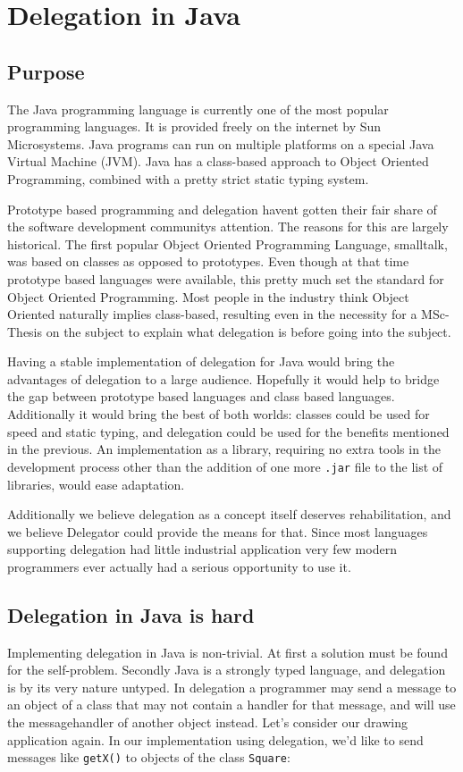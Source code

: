 \documentclass[a4paper,12pt]{book}
\begin{document}
\chapter{Delegation in Java}
\section*{Purpose}
The Java programming language is currently one of the most popular programming languages. It is provided freely on the internet by Sun Microsystems. Java programs can run on multiple platforms on a special Java Virtual Machine (JVM). Java has a class-based approach to Object Oriented Programming, combined with a pretty strict static typing system.

Prototype based programming and delegation havent gotten their fair share of the software development communitys attention. The reasons for this are largely historical. The first popular Object Oriented Programming Language, smalltalk, was based on classes as opposed to prototypes. Even though at that time prototype based languages were available, this pretty much set the standard for Object Oriented Programming. Most people in the industry think Object Oriented naturally implies class-based, resulting even in the necessity for a MSc-Thesis on the subject to explain what delegation is before going into the subject.

Having a stable implementation of delegation for Java would bring the advantages of delegation to a large audience. Hopefully it would help to bridge the gap between prototype based languages and class based languages. Additionally it would bring the best of both worlds: classes could be used for speed and static typing, and delegation could be used for the benefits mentioned in the previous. An implementation as a library, requiring no extra tools in the development process other than the addition of one more \verb|.jar| file to the list of libraries, would ease adaptation.

Additionally we believe delegation as a concept itself deserves rehabilitation, and we believe Delegator could provide the means for that. Since most languages supporting delegation had little industrial application very few modern programmers ever actually had a serious opportunity to use it.

\section*{Delegation in Java is hard}
Implementing delegation in Java is non-trivial. At first a solution must be found for the self-problem. Secondly Java is a strongly typed language, and delegation is by its very nature untyped. In delegation a programmer may send a message to an object of a class that may not contain a handler for that message, and will use the messagehandler of another object instead. Let's consider our drawing application again. In our implementation using delegation, we'd like to send messages like \verb|getX()| to objects of the class \verb|Square|:
\end{document}
